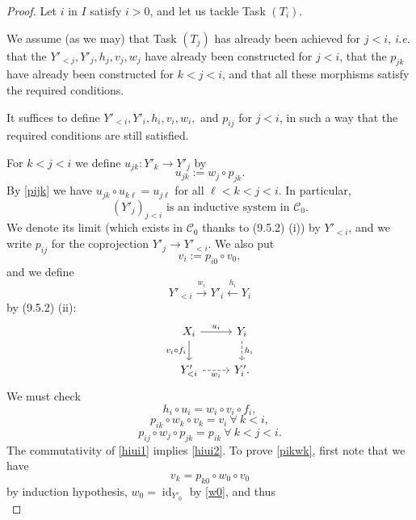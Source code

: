 \documentclass[12pt]{article}%
\theoremstyle{remark}
\theoremstyle{definition}
\newcommand{\C}{\mathcal C}
\newcommand{\xr}{\xrightarrow}
\DeclareMathOperator{\id}{id}
\begin{document}
\begin{proof}
Let $i$ in $I$ satisfy $i>0$, and let us tackle Task $(T_i)$. 

We assume (as we may) that Task $(T_j)$ has already been achieved for $j<i$, {\em i.e.} that the $Y'_{<j},Y'_j,h_j,v_j,w_j$ have already been constructed for $j<i$, that the $p_{jk}$ have already been constructed for $k<j<i$, and that all these morphisms satisfy the required conditions. 

It suffices to define $Y'_{<i},Y'_i,h_i,v_i,w_i,$ and $p_{ij}$ for $j<i$, in such a way that the required conditions are still satisfied. 

For $k<j<i$ we define $u_{jk}:Y'_k\to Y'_j$ by
%
\begin{equation}\label{ujk}
u_{jk}:=w_j\circ p_{jk}.
\end{equation}
%
By \eqref{pijk} we have $u_{jk}\circ u_{k\ell}=u_{j\ell}$ for all $\ell<k<j<i$. In particular, 
%
\begin{equation}\label{y'j}
(Y'_j)_{j<i}\text{ is an inductive system in }\C_0.
\end{equation}
%
We denote its limit (which exists in $\C_0$ thanks to (9.5.2) (i)) by $Y'_{<i}$, and we write $p_{ij}$ for the coprojection $Y'_j\to Y'_{<i}$. We also put
%
\begin{equation}\label{vi}
v_i:=p_{i0}\circ v_0,
\end{equation}
%
and we define
$$
Y'_{<i}\xr{w_i}Y'_i\xleftarrow{h_i}Y_i
$$
by (9.5.2) (ii):
%
\begin{equation}\label{hiui1}
\begin{tikzcd}
X_i\ar{d}[swap]{v_i\circ f_i}\ar{r}{u_i}&Y_i\ar[dashed]{d}{h_i}\\
Y'_{<i}\ar[dashed]{r}[swap]{w_i}&Y'_i.
\end{tikzcd}
\end{equation} 
%
We must check 
%
\begin{equation}\label{hiui2}
h_i\circ u_i=w_i\circ v_i\circ f_i,
\end{equation}
%
\begin{equation}\label{pikwk}
p_{ik}\circ w_k\circ v_k=v_i\ \forall\ k<i,
\end{equation}
%
\begin{equation}\label{pijwj}
p_{ij}\circ w_j\circ p_{jk}=p_{ik}\ \forall\ k<j<i.
\end{equation} 
%
The commutativity of \eqref{hiui1} implies \eqref{hiui2}. To prove \eqref{pikwk}, first note that we have 
$$v_k=p_{k0}\circ w_0\circ v_0
$$ 
by induction hypothesis, $w_0=\id_{Y'_0}$ by \eqref{w0}, and thus 
%
\begin{equation}\label{vk}

\end{equation}
\end{proof}
\end{document}

